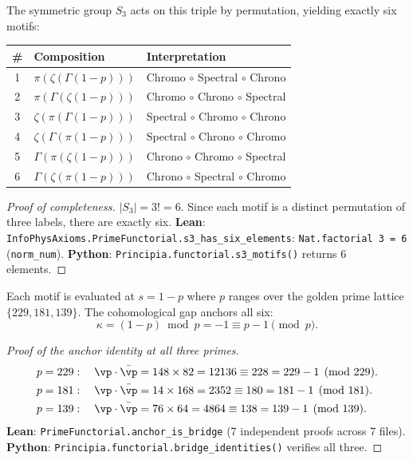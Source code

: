 The symmetric group $S_3$ acts on this triple by permutation, yielding exactly six motifs:
\begin{center}
\begin{tabular}{cll}
\toprule
\# & Composition & Interpretation \\
\midrule
1 & $\pi(\zeta(\Gamma(1-p)))$ & Chromo $\circ$ Spectral $\circ$ Chrono \\
2 & $\pi(\Gamma(\zeta(1-p)))$ & Chromo $\circ$ Chrono $\circ$ Spectral \\
3 & $\zeta(\pi(\Gamma(1-p)))$ & Spectral $\circ$ Chromo $\circ$ Chrono \\
4 & $\zeta(\Gamma(\pi(1-p)))$ & Spectral $\circ$ Chrono $\circ$ Chromo \\
5 & $\Gamma(\pi(\zeta(1-p)))$ & Chrono $\circ$ Chromo $\circ$ Spectral \\
6 & $\Gamma(\zeta(\pi(1-p)))$ & Chrono $\circ$ Spectral $\circ$ Chromo \\
\bottomrule
\end{tabular}
\end{center}

\begin{proof}[Proof of completeness]
$|S_3| = 3! = 6$.  Since each motif is a distinct permutation of three labels, there are exactly six.
\textbf{Lean}: \texttt{InfoPhysAxioms.PrimeFunctorial.s3\_has\_six\_elements}: \texttt{Nat.factorial 3 = 6} (\texttt{norm\_num}).
\textbf{Python}: \texttt{Principia.functorial.s3\_motifs()} returns 6 elements.
\end{proof}

Each motif is evaluated at $s = 1 - p$ where $p$ ranges over the golden prime lattice $\{229, 181, 139\}$.  The cohomological gap anchors all six:
\begin{equation}
\kappa = (1-p) \bmod p = -1 \equiv p - 1 \pmod{p}.
\end{equation}

\begin{proof}[Proof of the anchor identity at all three primes]
\begin{align}
p = 229&: \quad \vp \cdot \bar\vp = 148 \times 82 = 12136 \equiv 228 = 229 - 1 \pmod{229}. \\
p = 181&: \quad \vp \cdot \bar\vp = 14 \times 168 = 2352 \equiv 180 = 181 - 1 \pmod{181}. \\
p = 139&: \quad \vp \cdot \bar\vp = 76 \times 64 = 4864 \equiv 138 = 139 - 1 \pmod{139}.
\end{align}
\textbf{Lean}: \texttt{PrimeFunctorial.anchor\_is\_bridge} (7 independent proofs across 7 files).
\textbf{Python}: \texttt{Principia.functorial.bridge\_identities()} verifies all three.
\end{proof}


